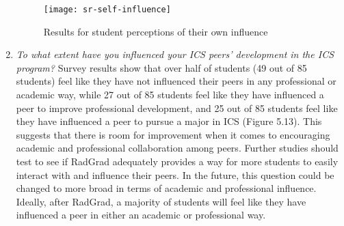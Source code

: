 \begin{enumerate}
\begin{figure}[h]
\centering
\texttt{[image: sr-self-influence]}
\caption{Results for student perceptions of their own influence}
\end{figure}
\item \textit{To what extent have you influenced your ICS peers’ development in the ICS program?}
Survey results show that over half of students (49 out of 85 students) feel like they have not influenced their peers in any professional or academic way, while 27 out of 85 students feel like they have influenced a peer to improve professional development, and 25 out of 85 students feel like they have influenced a peer to pursue a major in ICS (Figure 5.13). This suggests that there is room for improvement when it comes to encouraging academic and professional collaboration among peers. Further studies should test to see if RadGrad adequately provides a way for more students to easily interact with and influence their peers. In the future, this question could be changed to more broad in terms of academic and professional influence. Ideally, after RadGrad, a majority of students will feel like they have influenced a peer in either an academic or professional way. 
\end{enumerate}

